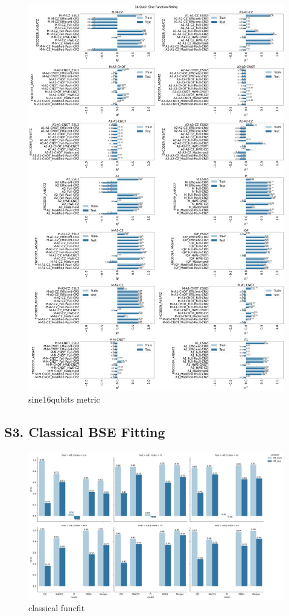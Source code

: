 \documentclass[journal=jacsat,manuscript=article]{achemso}
\begin{document}
\begin{figure}[H]
	\centering
	\includegraphics[width=0.8\linewidth]{images/16qubit_Sine_funcfit_R2.png}
	\caption{sine16qubits metric}
	\label{fig:sine16qubits_metric}
\end{figure}

\newpage
\subsection*{S3. Classical BSE Fitting}\label{SI_subsection:Classical_BSE_Fitting}

\begin{figure}[H]
	\centering
	\includegraphics[width=\linewidth]{images/classical_funcfit.png}
	\caption{classical funcfit}
	\label{fig:classical_funcfit}
\end{figure}
\end{document}
